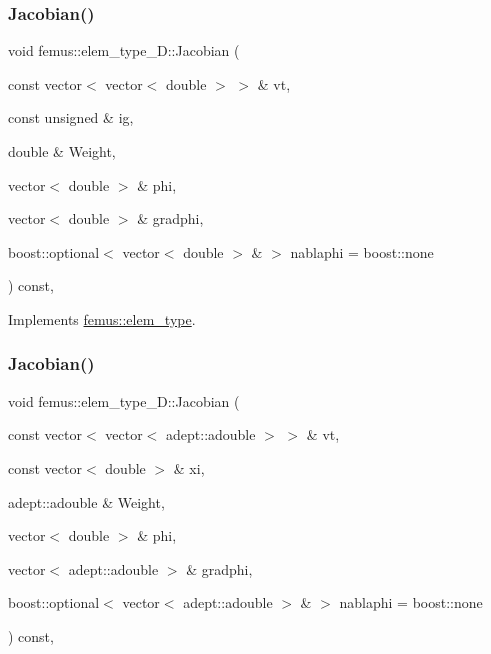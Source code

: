 \mbox{\label{classfemus_1_1elem__type__2_d_afa07b600dc9f53257ca5fde905dc6732}} 
\subsubsection{\texorpdfstring{Jacobian()}{Jacobian()}\hspace{0.1cm}{\footnotesize\ttfamily [2/4]}}
{\footnotesize\ttfamily void femus\+::elem\+\_\+type\+\_\+D\+::\+Jacobian (\begin{DoxyParamCaption}\item[{const vector$<$ vector$<$ double $>$ $>$ \&}]{vt,  }\item[{const unsigned \&}]{ig,  }\item[{double \&}]{Weight,  }\item[{vector$<$ double $>$ \&}]{phi,  }\item[{vector$<$ double $>$ \&}]{gradphi,  }\item[{boost\+::optional$<$ vector$<$ double $>$ \& $>$}]{nablaphi = {\ttfamily boost\+:\+:none} }\end{DoxyParamCaption}) const\hspace{0.3cm}{\ttfamily [inline]}, {\ttfamily [virtual]}}



Implements \mbox{\hyperlink{classfemus_1_1elem__type_ac3828ecd8ddd057d726a60cb19c60f0b}{femus\+::elem\+\_\+type}}.

\mbox{\label{classfemus_1_1elem__type__2_d_ab63098a94dbccfc4808881b61fc9ab81}} 
\subsubsection{\texorpdfstring{Jacobian()}{Jacobian()}\hspace{0.1cm}{\footnotesize\ttfamily [3/4]}}
{\footnotesize\ttfamily void femus\+::elem\+\_\+type\+\_\+D\+::\+Jacobian (\begin{DoxyParamCaption}\item[{const vector$<$ vector$<$ adept\+::adouble $>$ $>$ \&}]{vt,  }\item[{const vector$<$ double $>$ \&}]{xi,  }\item[{adept\+::adouble \&}]{Weight,  }\item[{vector$<$ double $>$ \&}]{phi,  }\item[{vector$<$ adept\+::adouble $>$ \&}]{gradphi,  }\item[{boost\+::optional$<$ vector$<$ adept\+::adouble $>$ \& $>$}]{nablaphi = {\ttfamily boost\+:\+:none} }\end{DoxyParamCaption}) const\hspace{0.3cm}{\ttfamily [inline]}, {\ttfamily [virtual]}}



